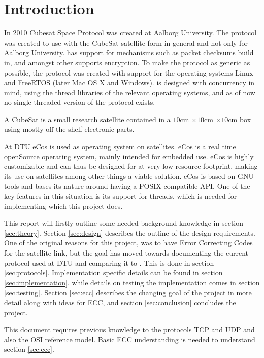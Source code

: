 \section{Introduction}
\label{sec:intro}

In 2010 Cubesat Space Protocol was created at Aalborg University. The protocol was created to use with the CubeSat satellite form in general and not only for Aalborg University. \CSP{} has support for mechanisms such as packet checksums build in, and amongst other supports encryption. To make the protocol as generic as possible, the protocol was created with support for the operating systems Linux and FreeRTOS (later Mac OS X and Windows). \CSP{} is designed with concurrency in mind, using the thread libraries of the relevant operating systems, and as of now no single threaded version of the protocol exists.

A CubeSat is a small research satellite contained in a $10$cm $\times 10$cm $\times 10$cm box using mostly off the shelf electronic parts.

At DTU eCos is used as operating system on satellites. eCos is a real time openSource operating system, mainly intended for embedded use. eCos is highly customizable and can thus be designed for at very low resource footprint, making its use on satellites among other things a viable solution.
eCos is based on GNU tools and bases its nature around having a POSIX compatible API. One of the key features in this situation is its support for threads, which is needed for implementing \CSP{} which this project does.

This report will firstly outline some needed background knowledge in section \ref{sec:theory}. Section \ref{sec:design} describes the outline of the design requirements.
One of the original reasons for this project, was to have Error Correcting Codes for the satellite link, but the goal has moved towards documenting the current protocol used at DTU and comparing it to \CSP{}. This is done in section \ref{sec:protocols}. Implementation specific details can be found in section \ref{sec:implementation}, while details on testing the implementation comes in section \ref{sec:testing}. Section \ref{sec:ecc} describes the changing goal of the project in more detail along with ideas for ECC, and section \ref{sec:conclusion} concludes the project.

This document requires previous knowledge to the protocols TCP and UDP and also the OSI reference model. Basic ECC understanding is needed to understand section \ref{sec:ecc}.